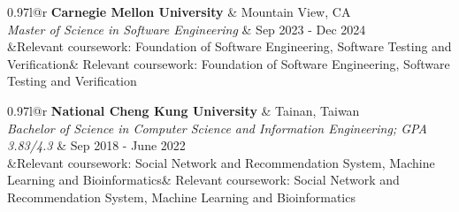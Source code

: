 \newcommand{\resumeEduEntry}[5]{
  \vspace{5pt}\item
    \begin{tabular*}{0.97\textwidth}{l@{\extracolsep{\fill}}r}
      \textbf{#1} & \small #2 \\
      \textit{#3} & \small #4 \\
      \ifx&#5&%
      \else \textbullet #5 \\ \fi
    \end{tabular*}\vspace{-5pt}
}

\resumeEduEntry 
{Carnegie Mellon University}
{Mountain View, CA}
{Master of Science in Software Engineering}
{Sep 2023 - Dec 2024}
{Relevant coursework: Foundation of Software Engineering, Software Testing and Verification}

\resumeEduEntry
{National Cheng Kung University}
{Tainan, Taiwan}
{Bachelor of Science in Computer Science and Information Engineering; GPA 3.83/4.3}
{Sep 2018 - June 2022}
{Relevant coursework: Social Network and Recommendation System, Machine Learning and Bioinformatics}
